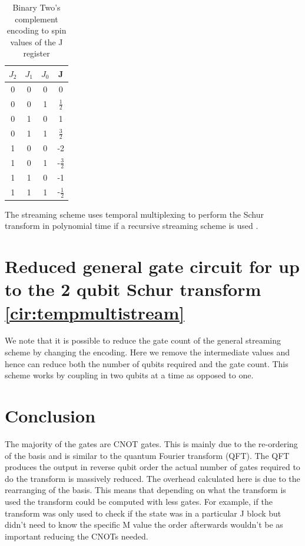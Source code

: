 \documentclass[12pt]{article}
\begin{document}
\begin{table}
\begin{tabular}{ |c c c|c| }
\hline
 $J_2$ &$J_1$ &$J_0$ &J \\
 \hline
 0 &0 &0 &0 \\ 
 0 &0 &1 &$\frac{1}{2}$ \\ 
 0 &1 &0 &1 \\ 
 0 &1 &1 &$\frac{3}{2}$ \\ 
 \hline 
 1 &0 &0 &-2 \\ 
 1 &0 &1 &-$\frac{3}{2}$ \\ 
 1 &1 &0 &-1 \\ 
 1 &1 &1 &-$\frac{1}{2}$ \\  
 \hline 
\end{tabular}
\caption{Binary Two's complement encoding to spin values of the J register}
\label{tab:encoding}
\vspace{-110pt}
\end{table}

The streaming scheme uses temporal multiplexing to perform the Schur transform in polynomial time if a recursive streaming scheme is used \cite{bacon2007quantum}.

\section{Reduced general gate circuit for up to the 2 qubit Schur transform \autoref{cir:tempmultistream}}

We note that it is possible to reduce the gate count of the general streaming scheme by changing the encoding. Here we remove the intermediate values and hence can reduce both the number of qubits required and the gate count. This scheme works by coupling in two qubits at a time as opposed to one.

\section{Conclusion}

The majority of the gates are CNOT gates. This is mainly due to the re-ordering of the basis and is similar to the quantum Fourier transform (QFT). The QFT produces the output in reverse qubit order the actual number of gates required to do the transform is massively reduced. The overhead calculated here is due to the rearranging of the basis. This means that depending on what the transform is used the transform could be computed with less gates. For example, if the transform was only used to check if the state was in a particular J block but didn't need to know the specific M value the order afterwards wouldn't be as important reducing the CNOTs needed.
\end{document}
